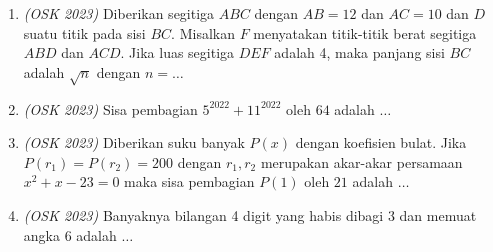 \documentclass[11pt]{scrartcl}
\begin{document}
\begin{enumerate}
    \item \textit{(OSK 2023)} Diberikan segitiga $ABC$ dengan $AB= 12$ dan $AC = 10$ dan $D$ suatu titik pada sisi $BC$. Misalkan $F$ menyatakan titik-titik berat segitiga $ABD$ dan $ACD$. Jika luas segitiga $DEF$ adalah 4, maka panjang sisi $BC$ adalah $\sqrt{n}$ dengan $n = \dots$ 
    
    \item \textit{(OSK 2023)} Sisa pembagian $5^{2022}+11^{2022}$ oleh $64$ adalah $\dots$
    
    \item \textit{(OSK 2023)} Diberikan suku banyak $P(x)$ dengan koefisien bulat. Jika $P(r_1)=P(r_2)=200$ dengan $r_1,r_2$ merupakan akar-akar persamaan $x^2+x-23=0$ maka sisa pembagian $P(1)$ oleh $21$ adalah $\dots$
    
    \item \textit{(OSK 2023)} Banyaknya bilangan 4 digit yang habis dibagi 3 dan memuat angka 6 adalah $\dots$ 
\end{enumerate}
\end{document}
